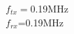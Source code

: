 \documentclass[preview]{standalone}
\begin{document}
\begin{center}
$f_{tx}=$0.19MHz\\$f_{rx}$=0.19MHz
\end{center}
\end{document}
